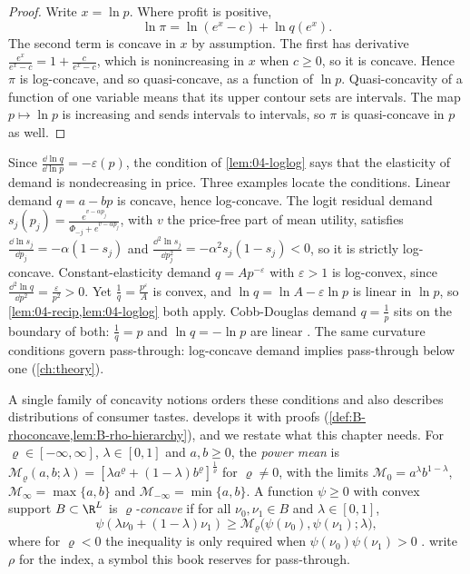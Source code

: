 \begin{proof}
Write $x = \ln p$. Where profit is positive,
\[
  \ln \pi = \ln(e^x - c) + \ln q(e^x).
\]
The second term is concave in $x$ by assumption. The first has derivative $\frac{e^x}{e^x - c} = 1 + \frac{c}{e^x - c}$,
which is nonincreasing in $x$ when $c \ge 0$, so it is concave. Hence $\pi$ is log-concave, and so
quasi-concave, as a function of $\ln p$. Quasi-concavity of a function of one variable means that its upper
contour sets are intervals. The map $p \mapsto \ln p$ is increasing and sends intervals to intervals, so $\pi$ is
quasi-concave in $p$ as well.
\end{proof}

Since $\frac{\dd\ln q}{\dd\ln p} = -\varepsilon(p)$, the condition of \cref{lem:04-loglog} says that the
elasticity of demand is nondecreasing in price. Three examples locate the conditions. Linear demand
$q = a - bp$ is concave, hence log-concave. The logit residual demand
$s_j(p_j) = \frac{e^{v - \alpha p_j}}{\Phi_{-j} + e^{v - \alpha p_j}}$, with $v$ the price-free part of mean
utility, satisfies $\frac{\dd\ln s_j}{\dd p_j} = -\alpha(1 - s_j)$ and
$\frac{\dd^2\ln s_j}{\dd p_j^2} = -\alpha^2 s_j(1 - s_j) < 0$, so it is strictly log-concave.
Constant-elasticity demand $q = Ap^{-\varepsilon}$ with $\varepsilon > 1$ is log-convex, since
$\frac{\dd^2\ln q}{\dd p^2} = \frac{\varepsilon}{p^2} > 0$. Yet $\frac{1}{q} = \frac{p^\varepsilon}{A}$ is convex,
and $\ln q = \ln A - \varepsilon\ln p$ is linear in $\ln p$, so \cref{lem:04-recip,lem:04-loglog} both apply.
Cobb-Douglas demand $q = \frac{1}{p}$ sits on the boundary of both: $\frac{1}{q} = p$ and $\ln q = -\ln p$ are
linear \citep[p.~22]{CaplinNalebuff1991}. The same curvature conditions govern pass-through: log-concave demand
implies pass-through below one (\cref{ch:theory}).

A single family of concavity notions orders these conditions and also describes distributions of consumer
tastes.  develops it with proofs (\cref{def:B-rhoconcave,lem:B-rho-hierarchy}), and we restate
what this chapter needs. For $\varrho \in [-\infty, \infty]$, $\lambda \in [0,1]$ and $a, b \ge 0$, the
\emph{power mean} is $\mathcal{M}_\varrho(a, b; \lambda) = [\lambda a^\varrho + (1 - \lambda)b^\varrho]^{\frac{1}{\varrho}}$
for $\varrho \neq 0$, with the limits $\mathcal{M}_0 = a^\lambda b^{1 - \lambda}$, $\mathcal{M}_\infty = \max\{a, b\}$
and $\mathcal{M}_{-\infty} = \min\{a, b\}$. A function $\psi \ge 0$ with convex support $B \subset \R^L$ is
\emph{$\varrho$-concave} if for all $\nu_0, \nu_1 \in B$ and $\lambda \in [0,1]$,
\[
  \psi(\lambda\nu_0 + (1 - \lambda)\nu_1) \ge \mathcal{M}_\varrho\bigl(\psi(\nu_0), \psi(\nu_1); \lambda\bigr),
\]
where for $\varrho < 0$ the inequality is only required when $\psi(\nu_0)\psi(\nu_1) > 0$
\citep[p.~5]{CaplinNalebuff1991}.  write $\rho$ for the index, a symbol this book
reserves for pass-through.


